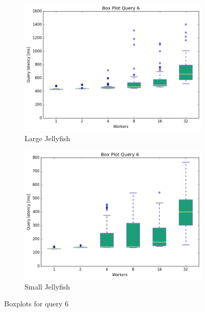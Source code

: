 \documentclass[11pt,singlecolumn]{scrartcl}
\begin{document}
\begin{figure}
\begin{subfigure}[b]{0.475\textwidth}
        \centering 
        \includegraphics[width=\textwidth]{boxesjl/q6}
        \caption[]%
        {{\small Large Jellyfish}}    
        \label{fig:mean and std of net34}
    \end{subfigure}
    \quad
    \begin{subfigure}[b]{0.475\textwidth}   
        \centering 
        \includegraphics[width=\textwidth]{boxesjs/q6}
        \caption[]%
        {{\small Small Jellyfish}}    
        \label{fig:mean and std of net44}
    \end{subfigure}
    \caption[  Boxplots for query 6 ]
    {\small Boxplots for query 6} 
    \label{fig:mean and std of nets}
\end{figure}
\clearpage
\end{document}
